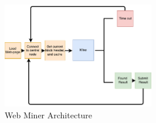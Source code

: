 \documentclass[10pt, conference, compsocconf]{IEEEtran}
\begin{document}
\begin{figure}[H]
\centering
\includegraphics[width=250px,keepaspectratio]{Hybrid-Miner.pdf}
\caption{\label{fig:hybridArchitecture} Web Miner Architecture}
\end{figure}



\end{document}

